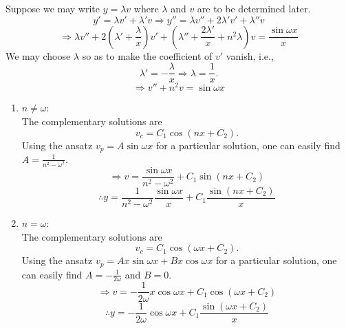 \item

Suppose we may write $y = \lambda v$ where $\lambda$ and $v$ are to be determined later.
\[
	y' = \lambda v' + \lambda' v
	\Rightarrow y'' = \lambda v'' + 2\lambda' v' + \lambda'' v
\]
\[
	\Rightarrow \lambda v''
	+ 2 \left(\lambda' + \frac{\lambda}{x} \right) v'
	+ \left( \lambda'' + \frac{2\lambda'}{x} + n^2 \lambda \right) v
	= \frac{\sin \omega x}{x}
\]
We may choose $\lambda$ so as to make the coefficient of $v'$ vanish, i.e.,
\[
	\lambda' = -\frac{\lambda}{x}
	\Rightarrow \lambda = \frac{1}{x}.
\]
\[
	\Rightarrow v'' + n^2 v = \sin \omega x
\]

\begin{enumerate}[wide, labelindent = 0pt, label = (\roman*)]
	\item $n \neq \omega$:\\
	      The complementary solutions are
	      \[
		      v_c = C_1 \cos \left( nx + C_2 \right).
	      \]
	      Using the ansatz $v_p = A \sin \omega x$ for a particular solution, one can easily find $A = \frac{1}{n^2 - \omega^2}$.
	      \[
		      \Rightarrow v = \frac{\sin \omega x}{n^2 - \omega^2} + C_1 \sin \left( nx + C_2 \right)
	      \]
	      \[
		      \therefore y = \frac{1}{n^2 - \omega^2} \frac{\sin \omega x}{x} + C_1 \frac{\sin \left( nx + C_2 \right)}{x}
	      \]

	\item $n = \omega$:\\
	      The complementary solutions are
	      \[
		      v_c = C_1 \cos \left( \omega x + C_2 \right).
	      \]
	      Using the ansatz $v_p = Ax \sin \omega x + Bx \cos \omega x$ for a particular solution, one can easily find $A = -\frac{1}{2\omega}$ and $B = 0$.
	      \[
		      \Rightarrow v = -\frac{1}{2\omega} x \cos \omega x + C_1 \cos \left( \omega x + C_2 \right)
	      \]
	      \[
		      \therefore y = -\frac{1}{2\omega} \cos \omega x + C_1 \frac{\sin \left( \omega x + C_2 \right)}{x}
	      \]
\end{enumerate}
